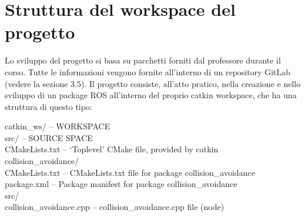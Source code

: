\section{Struttura del workspace del progetto}

Lo sviluppo del progetto si basa su pacchetti forniti dal professore durante il corso. Tutte le informazioni vengono fornite all'interno di un repository GitLab (vedere la sezione 3.5). Il progetto consiste, all'atto pratico, nella creazione e nello sviluppo di un package ROS all’interno del proprio catkin workspace, che ha una struttura di questo tipo:\\
\begin{tabbing}
	catkin\_ws/ \quad \quad       -- WORKSPACE\\
	\quad src/ \quad \quad \quad \quad \quad \quad                -- SOURCE SPACE\\
	\quad \quad CMakeLists.txt \quad  \quad   -- `Toplevel' CMake file, provided by catkin\\
	\quad \quad collision\_avoidance/\\
	\quad \quad \quad CMakeLists.txt \quad \quad    -- CMakeLists.txt file for package collision\_avoidance\\
	\quad \quad \quad package.xml \quad \quad \quad \space -- Package manifest for package collision\_avoidance\\
	\quad \quad \quad src/\\
	\quad \quad \quad \quad collision\_avoidance.cpp \quad \quad 	-- collision\_avoidance.cpp file (node) 
\end{tabbing}

